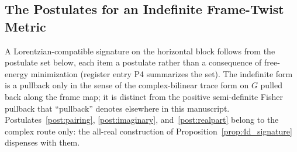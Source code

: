 \documentclass[11pt]{article}
\begin{document}
\subsection{The Postulates for an Indefinite Frame-Twist Metric}

A Lorentzian-compatible signature on the horizontal block follows from the postulate set below, each item a postulate rather than a consequence of free-energy minimization (register entry P4 summarizes the set). The indefinite form is a pullback only in the sense of the complex-bilinear trace form on $G$ pulled back along the frame map; it is distinct from the positive semi-definite Fisher pullback that ``pullback'' denotes elsewhere in this manuscript. Postulates~\ref{post:pairing}, \ref{post:imaginary}, and~\ref{post:realpart} belong to the complex route only: the all-real construction of Proposition~\ref{prop:4d_signature} dispenses with them.
\end{document}
